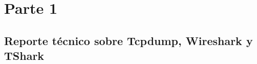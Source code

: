 \documentclass[12pt]{article} %
\begin{document}

\tableofcontents %

\newpage %



\section{Parte 1} %


\subsection{ Reporte técnico sobre Tcpdump, Wireshark y TShark} %
\end{document}
